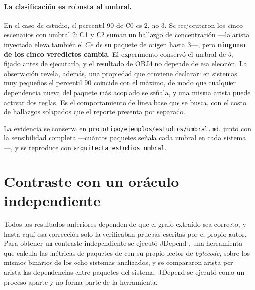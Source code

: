 \paragraph{La clasificación es robusta al umbral.} En el caso de estudio, el percentil 90 de C0 es 2, no 3. Se reejecutaron los cinco escenarios con umbral 2: C1 y C2 suman un hallazgo de concentración ---la arista inyectada eleva también el $Ce$ de su paquete de origen hasta 3---, pero \textbf{ninguno de los cinco veredictos cambia}. El experimento conservó el umbral de 3, fijado antes de ejecutarlo, y el resultado de OBJ4 no depende de esa elección. La observación revela, además, una propiedad que conviene declarar: en sistemas muy pequeños el percentil 90 coincide con el máximo, de modo que cualquier dependencia nueva del paquete más acoplado se señala, y una misma arista puede activar dos reglas. Es el comportamiento de línea base que se busca, con el costo de hallazgos solapados que el reporte presenta por separado.

La evidencia se conserva en \texttt{prototipo/ejemplos/estudios/umbral.md}, junto con la sensibilidad completa ---cuántos paquetes señala cada umbral en cada sistema---, y se reproduce con \texttt{arquitecta estudios umbral}.

\section{Contraste con un oráculo independiente}
\label{sec:oraculo}
Todos los resultados anteriores dependen de que el grafo extraído sea correcto, y hasta aquí esa corrección solo la verificaban pruebas escritas por el propio autor. Para obtener un contraste independiente se ejecutó JDepend \citep{JDepend}, una herramienta que calcula las métricas de paquetes de \citet{Martin2003} con su propio lector de \textit{bytecode}, sobre los mismos binarios de los ocho sistemas analizados, y se compararon arista por arista las dependencias entre paquetes del sistema. JDepend se ejecutó como un proceso aparte y no forma parte de la herramienta.

